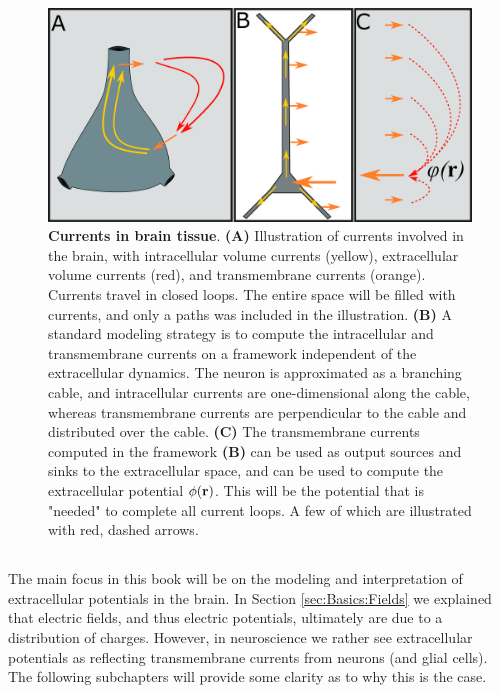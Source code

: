 \begin{figure}[!ht]
\begin{center}
\includegraphics[width=1.0\textwidth]{Figures/Basics/Twostep.png}
\end{center}
\caption{{\bf Currents in brain tissue}. {\bf(A)} Illustration of currents involved in the brain, with intracellular volume currents (yellow), extracellular volume currents (red), and transmembrane currents (orange). Currents travel in closed loops. The entire space will be filled with currents, and only a paths was included in the illustration. {\bf(B)} A standard modeling strategy is to compute the intracellular and transmembrane currents on a framework independent of the extracellular dynamics. The neuron is approximated as a branching cable, and intracellular currents are one-dimensional along the cable, whereas transmembrane currents are perpendicular to the cable and distributed over the cable. {\bf(C)} The transmembrane currents computed in the framework {\bf(B)} can be used as output sources and sinks to the extracellular space, and can be used to compute the extracellular potential $\phi({\bf r})$. This will be the potential that is "needed" to complete all current loops. A few of which are illustrated with red, dashed arrows. 
}
\label{fig:Basics:Twostep}
\end{figure}


\subsection{}
\label{sec:Basics:ECSpot}
The main focus in this book will be on the modeling and interpretation of extracellular potentials in the brain. In Section \ref{sec:Basics:Fields} we explained that electric fields, and thus electric potentials, ultimately are due to a distribution of charges. However, in neuroscience we rather see extracellular potentials as reflecting transmembrane currents from neurons (and glial cells). The following subchapters will provide some clarity as to why this is the case. 

